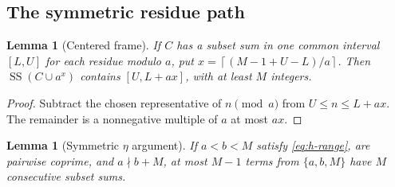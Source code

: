 \documentclass[11pt,a4paper,reqno]{amsart}
\newtheorem{lemma}[theorem]{Lemma}
\theoremstyle{definition}
\theoremstyle{remark}
\newcommand{\ssum}{\operatorname{SS}}
\newcommand{\ceil}[1]{\left\lceil #1\right\rceil}
\begin{document}
\subsection{The symmetric residue path}
\begin{lemma}[Centered frame]\label{lem:frame}
If $C$ has a subset sum in one common interval $[L,U]$ for each residue
modulo $a$, put $x=\ceil{(M-1+U-L)/a}$. Then
$\ssum(C\cup a^x)$ contains $[U,L+ax]$, with at least $M$ integers.
\end{lemma}
\begin{proof}
Subtract the chosen representative of $n\pmod a$ from
$U\le n\le L+ax$. The remainder is a nonnegative multiple of $a$ at most $ax$.
\end{proof}
\begin{lemma}[Symmetric $\eta$ argument]\label{lem:eta}
If $a<b<M$ satisfy \eqref{eq:h-range}, are pairwise coprime, and
$a\nmid b+M$, at most $M-1$ terms from $\{a,b,M\}$ have $M$ consecutive
subset sums.
\end{lemma}
\end{document}
